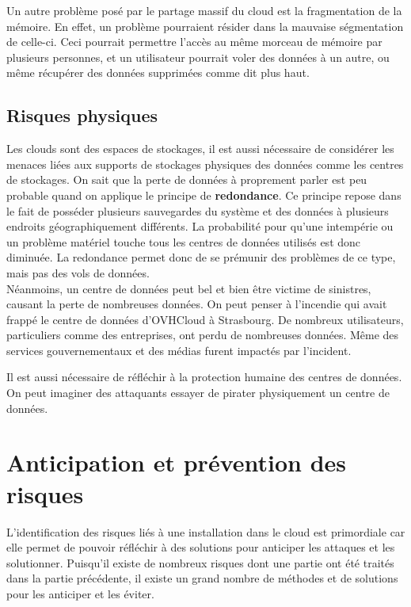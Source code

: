 \documentclass[a4paper, 12pt]{article}
\begin{document}
\begin{spacing}{1.1}
      Un autre problème posé par le partage massif du cloud est la fragmentation
      de la mémoire. En effet, un problème pourraient résider dans la mauvaise
      ségmentation de celle-ci. Ceci pourrait permettre l'accès au même
      morceau de mémoire par plusieurs personnes, et un utilisateur pourrait
      voler des données à un autre, ou même récupérer des données supprimées
      comme dit plus haut.

    \subsection{Risques physiques}
      Les clouds sont des espaces de stockages, il est aussi nécessaire de
      considérer les menaces liées aux supports de stockages physiques des
      données comme les centres de stockages. On sait que la perte de données
      à proprement parler est peu probable quand on applique le principe de
      \textbf{redondance}. Ce principe repose dans le fait de posséder plusieurs
      sauvegardes du système et des données à plusieurs endroits
      géographiquement différents. La probabilité pour qu'une intempérie ou un
      problème matériel touche tous les centres de données utilisés est donc
      diminuée. La redondance permet donc de se prémunir des problèmes de ce
      type, mais pas des vols de données. \\

      Néanmoins, un centre de données peut bel et bien être victime de
      sinistres, causant la perte de nombreuses données. On peut penser à
      l'incendie qui avait frappé le centre de données d'OVHCloud à Strasbourg.
      De nombreux utilisateurs, particuliers comme des entreprises, ont perdu de
      nombreuses données. Même des services gouvernementaux et des médias furent
      impactés par l'incident.

      Il est aussi nécessaire de réfléchir à la protection humaine des centres
      de données. On peut imaginer des attaquants essayer de pirater
      physiquement un centre de données.

  \section{Anticipation et prévention des risques}
      L'identification des risques liés à une installation dans le cloud est
      primordiale car elle permet de pouvoir réfléchir à des solutions pour
      anticiper les attaques et les solutionner. Puisqu'il existe de nombreux
      risques dont une partie ont été traités dans la partie précédente, il
      existe un grand nombre de méthodes et de solutions pour les anticiper
      et les éviter.


\end{spacing}
\end{document}
